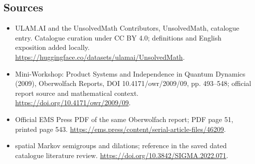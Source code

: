 \documentclass[11pt]{article}
\begin{document}
\subsection{Sources}
\begin{itemize}
\item[\hypertarget{source:statement:1}{S1}] ULAM.AI and the UnsolvedMath Contributors, UnsolvedMath, catalogue entry. Catalogue curation under CC BY 4.0; definitions and English exposition added locally.
\url{https://huggingface.co/datasets/ulamai/UnsolvedMath}.
\item[\hypertarget{source:statement:2}{S2}] Mini-Workshop: Product Systems and Independence in Quantum Dynamics (2009), Oberwolfach Reports, DOI 10.4171/owr/2009/09, pp. 493--548; official report source and mathematical context.
\url{https://doi.org/10.4171/owr/2009/09}.
\item[\hypertarget{source:statement:3}{S3}] Official EMS Press PDF of the same Oberwolfach report; PDF page 51, printed page 543.
\url{https://ems.press/content/serial-article-files/46209}.
\item[\hypertarget{source:statement:4}{S4}] spatial Markov semigroups and dilations; reference in the saved dated catalogue literature review.
\url{https://doi.org/10.3842/SIGMA.2022.071}.
\end{itemize}
\label{end:statement}
\end{document}

